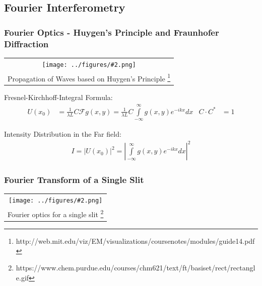\documentclass[10pt]{beamer}
\newcommand{\gra}[3][]{
	\begin{table}
	\centering
	\begin{tabular}[width=\textwidth]{c}
		\texttt{[image: ../figures/\#2.png]}\\
		\small #3
	\end{tabular}
	\end{table}
}
\begin{document}
\subsection{Fourier Interferometry}
\frame{\tableofcontents[currentsubsection]}
\begin{frame}
	\frametitle{Fourier Optics - Huygen's Principle and Fraunhofer Diffraction}
	\gra[0.6]{Huygen}{Propagation of Waves based on Huygen's Principle \footnote{http://web.mit.edu/viz/EM/visualizations/coursenotes/modules/guide14.pdf}}
		Fresnel-Kirchhoff-Integral Formula:
		\begin{align}
		U(x_0) &= \frac{1}{\lambda L} C \mathscr{F}{g(x, y)}    = \frac{1}{\lambda L} C   \int\limits_{-\infty}^{\infty}  g(x,y)e^{-ikx}dx    &  C  \cdot C^* &= 1       
		\end{align}
		
		Intensity Distribution in the Far field:
		\begin{align}
		I=|U(x_0)|^2=\left| \int\limits_{-\infty}^{\infty} g(x,y)e^{-ikx}dx \right|^2
		\end{align}
\end{frame}

\begin{frame}
	\frametitle{Fourier Transform of a Single Slit}
\gra[0.8]{Einzelspalt}{Fourier optics for a single slit \footnote{https://www.chem.purdue.edu/courses/chm621/text/ft/basiset/rect/rectangle.gif}}
\end{frame}
\end{document}
